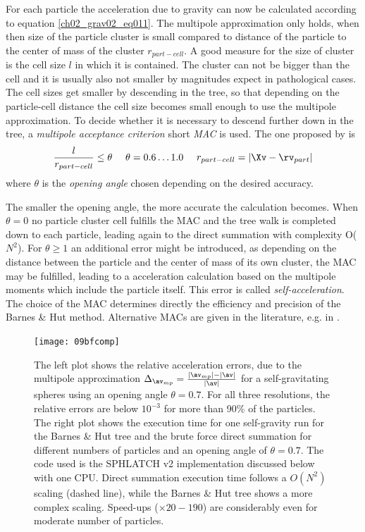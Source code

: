 For each particle the acceleration due to gravity can now be calculated according to equation \ref{ch02_grav02_eq011}. The multipole approximation only holds, when then size of the particle cluster is small compared to distance of the particle to the center of mass of the cluster $r_{part- cell}$. A good measure for the size of cluster is the cell size $l$ in which it is contained. The cluster can not be bigger than the cell and it is usually also not smaller by magnitudes expect in pathological cases. The cell sizes get smaller by descending in the tree, so that depending on the particle-cell distance the cell size becomes small enough to use the multipole approximation. To decide whether it is necessary to descend further down in the tree, a \emph{multipole acceptance criterion} short \emph{MAC} is used. The one proposed by \cite{Barnes:1986p2853} is
\begin{equation}
\label{ch02_grav02_eq013}
\frac{l}{r_{part-cell}} \le \theta ~~~~ \theta = 0.6 \dots 1.0 ~~~~ r_{part-cell} = | \Xv - \rv_{part}|
\end{equation}
where $\theta$ is the \emph{opening angle} chosen depending on the desired accuracy. 

The smaller the opening angle, the more accurate the calculation becomes. When $\theta = 0$ no particle cluster cell fulfills the MAC and the tree walk is completed down to each particle, leading again to the direct summation with complexity O($N^2$). For $\theta \ge 1$ an additional error might be introduced, as depending on the distance between the particle and the center of mass of its own cluster, the MAC may be fulfilled, leading to a acceleration calculation based on the multipole moments which include the particle itself. This error is called \emph{self-acceleration}. The choice of the MAC determines directly the efficiency and precision of the Barnes \& Hut method. Alternative MACs are given in the literature, e.g. in \cite{Stadel:2001p48}.

\begin{figure}[htbp]
\begin{center}
\texttt{[image: 09bfcomp]}
\caption{The left plot shows the relative acceleration errors, due to the multipole approximation $\Delta_{\av_{mp}} = \frac{|\av_{mp}| - |\av|}{|\av|}$ for a self-gravitating spheres using an opening angle $\theta = 0.7$. For all three resolutions, the relative errors are below $10^{-3}$ for more than 90\% of the particles. 
The right plot shows the execution time for one self-gravity run for the Barnes \& Hut tree and the brute force direct summation for different numbers of particles and an opening angle of $\theta = 0.7$. The code used is the SPHLATCH v2 implementation discussed below with one CPU. Direct summation execution time follows a $O(N^2)$ scaling (dashed line), while the Barnes \& Hut tree shows a more complex scaling. Speed-ups ($\times 20-190$) are considerably even for moderate number of particles.}
\label{ch02_fig09}
\end{center}
\end{figure}

